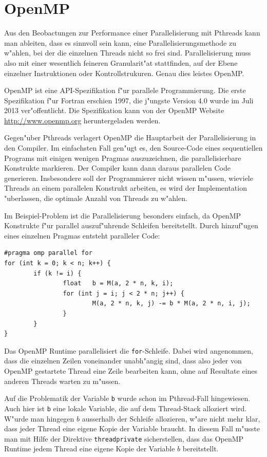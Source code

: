 \section{OpenMP\label{openmp-intro}}
Aus den Beobactungen zur Performance einer Parallelisierung mit
Pthreads kann man ableiten, dass es sinnvoll sein kann,
eine Parallelisierungsmethode zu w"ahlen, bei der die einzelnen
Threads nicht so frei sind.
Parallelisierung muss also mit einer wesentlich feineren Granularit"at
stattfinden, auf der Ebene einzelner Instruktionen oder Kontrollstrukuren.
Genau dies leistes OpenMP.

OpenMP ist eine API-Spezifikation f"ur parallele Programmierung.
Die erste Spezifikation f"ur Fortran erschien 1997, die j"ungste 
Version 4.0 wurde im Juli 2013 ver"offentlicht.
Die Spezifikation kann von der OpenMP Website \url{http://www.openmp.org}
heruntergeladen werden.

Gegen"uber Pthreads verlagert OpenMP die Hauptarbeit der Parallelisierung
in den Compiler. 
Im einfachsten Fall gen"ugt es, den Source-Code eines sequentiellen Programs
mit einigen wenigen Pragmas auszuzeichnen, die parallelisierbare
Konstrukte markieren. Der Compiler kann dann daraus parallelen Code
generieren. Insbesondere soll der Programmierer nicht wissen m"ussen, wieviele
Threads an einem parallelen Konstrukt arbeiten, es wird der Implementation
"uberlassen, die optimale Anzahl von Threads zu w"ahlen.

Im Beispiel-Problem ist die Parallelisierung besonders einfach, da
OpenMP Konstrukte f"ur parallel auszuf"uhrende Schleifen bereitstellt.
Durch hinzuf"ugen eines einzelnen Pragmas entsteht paralleler Code:
\begin{verbatim}
#pragma omp parallel for
for (int k = 0; k < n; k++) {
        if (k != i) {
                float   b = M(a, 2 * n, k, i);
                for (int j = i; j < 2 * n; j++) {
                        M(a, 2 * n, k, j) -= b * M(a, 2 * n, i, j);
                }
        }
}
\end{verbatim}
Das OpenMP Runtime parallelisiert die {\tt for}-Schleife. Dabei wird
angenommen, dass die einzelnen Zeilen voneinander unabh"angig sind, dass
also jeder von OpenMP gestartete Thread eine Zeile bearbeiten kann,
ohne auf Resultate eines anderen Threads warten zu m"ussen.

Auf die Problematik der Variable {\tt b} wurde schon im Pthread-Fall
hingewiesen. Auch hier ist {\tt b} eine lokale Variable, die auf
dem Thread-Stack alloziert wird. W"urde man hingegen $b$ ausserhalb
der Schleife allozieren, w"are nicht mehr klar, dass jeder Thread
eine eigene Kopie der Variable braucht. In diesem Fall m"usste man
mit Hilfe der Direktive {\tt threadprivate} sicherstellen, dass
das OpenMP Runtime jedem Thread eine eigene Kopie der Variable $b$
bereitstellt.

